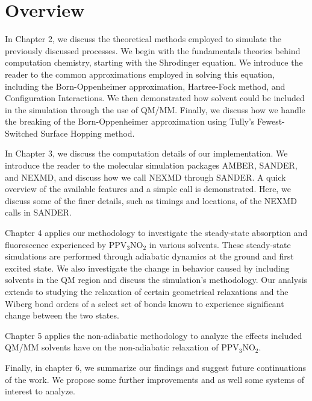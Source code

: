 \section{Overview}
In Chapter 2, we discuss the theoretical methods employed to simulate the previously discussed processes.
We begin with the fundamentals theories behind computation chemistry, starting with the Shrodinger equation.
We introduce the reader to the common approximations employed in solving this equation, including the Born-Oppenheimer approximation, Hartree-Fock method, and Configuration Interactions.
We then demonstrated how solvent could be included in the simulation through the use of QM/MM.
Finally, we discuss how we handle the breaking of the Born-Oppenheimer approximation using Tully's Fewest-Switched Surface Hopping method.

In Chapter 3, we discuss the computation details of our implementation.
We introduce the reader to the molecular simulation packages AMBER, SANDER, and NEXMD, and discuss how we call NEXMD through SANDER.
A quick overview of the available features and a simple call is demonstrated. Here, we discuss some of the finer details, such as timings and locations, of the NEXMD calls in SANDER.

Chapter 4 applies our methodology to investigate the steady-state absorption and fluorescence experienced by PPV\(_3\)NO\(_2\) in various solvents.
These steady-state simulations are performed through adiabatic dynamics at the ground and first excited state.
We also investigate the change in behavior caused by including solvents in the QM region and discuss the simulation's methodology.
Our analysis extends to studying the relaxation of certain geometrical relaxations and the Wiberg bond orders of a select set of bonds known to experience significant change between the two states.

Chapter 5 applies the non-adiabatic methodology to analyze the effects included QM/MM solvents have on the non-adiabatic relaxation of PPV\(_3\)NO\(_2\).

Finally, in chapter 6, we summarize our findings and suggest future continuations of the work.  We propose some further improvements and as well some systems of interest to analyze.

